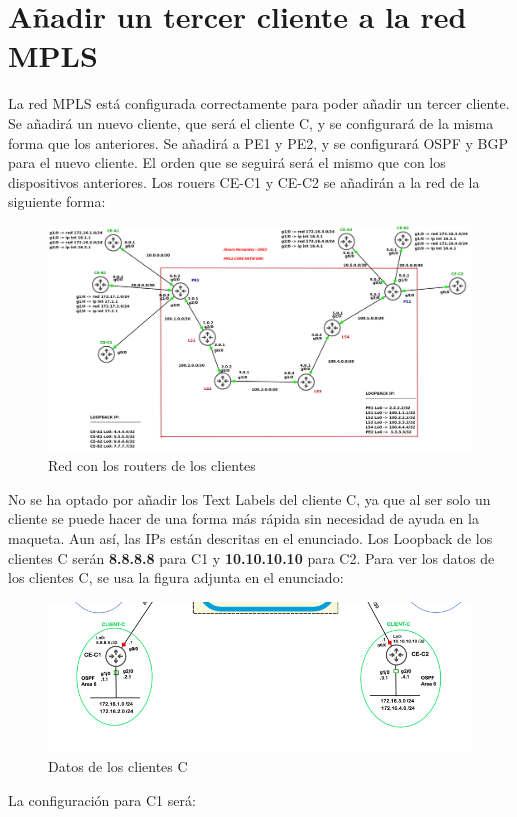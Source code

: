 \documentclass{article}
\begin{document}
\newpage
\section{Añadir un tercer cliente a la red MPLS}

La red MPLS está configurada correctamente para poder añadir un tercer cliente. Se añadirá un nuevo cliente, que será el cliente C, y se configurará de la misma forma que los anteriores. Se añadirá a PE1 y PE2, y se configurará OSPF y BGP para el nuevo cliente. El orden que se seguirá será el mismo que con los dispositivos anteriores. Los rouers CE-C1 y CE-C2 se añadirán a la red de la siguiente forma:

\begin{figure}[h]
    \centering
    \includegraphics[width=1\textwidth]{src/red.png}
    \caption{Red con los routers de los clientes}
\end{figure}

No se ha optado por añadir los Text Labels del cliente C, ya que al ser solo un cliente se puede hacer de una forma más rápida sin necesidad de ayuda en la maqueta. Aun así, las IPs están descritas en el enunciado.
Los Loopback de los clientes C serán \textbf{8.8.8.8} para C1 y \textbf{10.10.10.10} para C2.
Para ver los datos de los clientes C, se usa la figura adjunta en el enunciado:

\begin{figure}[h]
    \centering
    \includegraphics[width=1\textwidth]{src/ejemploip.png}
    \caption{Datos de los clientes C}
\end{figure}
\newpage
La configuración para C1 será:
\end{document}
